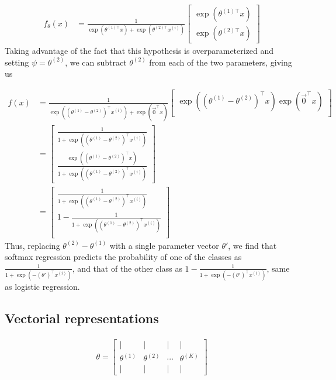 \begin{align} 
	f_\theta(x) &= \frac{1}{ \exp(\theta^{(1)\top}x) + \exp( \theta^{(2)\top} x^{(i)} ) } \begin{bmatrix} \exp( \theta^{(1)\top} x ) \\ \exp( \theta^{(2)\top} x ) \end{bmatrix} 
\end{align}
Taking advantage of the fact that this hypothesis is overparameterized and setting $\psi = \theta^{(2)}$, we can subtract $\theta^{(2)}$ from each of the two parameters, giving us

\begin{align} f(x) &= \frac{1}{ \exp( (\theta^{(1)}-\theta^{(2)})^\top x^{(i)} ) + \exp(\vec{0}^\top x) } \begin{bmatrix} \exp( (\theta^{(1)}-\theta^{(2)})^\top x ) \exp( \vec{0}^\top x ) \\ \end{bmatrix} \\ &= \begin{bmatrix} \frac{1}{ 1 + \exp( (\theta^{(1)}-\theta^{(2)})^\top x^{(i)} ) } \\ \frac{\exp( (\theta^{(1)}-\theta^{(2)})^\top x )}{ 1 + \exp( (\theta^{(1)}-\theta^{(2)})^\top x^{(i)} ) } \end{bmatrix} \\ &= \begin{bmatrix} \frac{1}{ 1 + \exp( (\theta^{(1)}-\theta^{(2)})^\top x^{(i)} ) } \\ 1 - \frac{1}{ 1 + \exp( (\theta^{(1)}-\theta^{(2)})^\top x^{(i)} ) } \\ \end{bmatrix} 
\end{align}
Thus, replacing $\theta^{(2)}-\theta^{(1)}$ with a single parameter vector $\theta'$, we find that softmax regression predicts the probability of one of the classes as $\frac{1}{ 1 + \exp(- (\theta')^\top x^{(i)} ) }$, and that of the other class as $1 - \frac{1}{ 1 + \exp(- (\theta')^\top x^{(i)} ) }$, same as logistic regression.



\subsection{Vectorial representations}
\begin{align}
	\theta = \left[\begin{array}{cccc}| & | & | & | \\ \theta^{(1)} & \theta^{(2)} & \cdots & \theta^{(K)} \\ | & | & | & | \end{array}\right]
\end{align}












